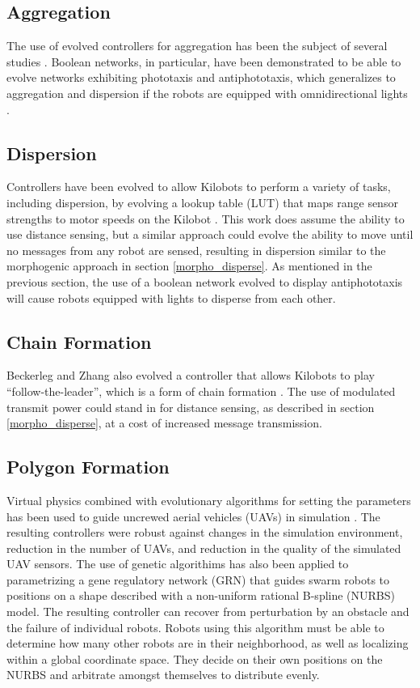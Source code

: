 \documentclass[]{article}
\begin{document}
\subsection{Aggregation}

The use of evolved controllers for aggregation has been the subject of several studies \cite{dorigo2004evolving,bahgecci2005evolving}. 
Boolean networks, in particular, have been demonstrated to be able to evolve networks exhibiting phototaxis and antiphototaxis, which generalizes to aggregation and dispersion if the robots are equipped with omnidirectional lights \cite{roli2011design}.

\subsection{Dispersion}

Controllers have been evolved to allow Kilobots to perform a variety of tasks, including dispersion, by evolving a lookup table (LUT) that maps range sensor strengths to motor speeds on the Kilobot \cite{beckerleg2016evolving}.
This work does assume the ability to use distance sensing, but a similar approach could evolve the ability to move until no messages from any robot are sensed, resulting in dispersion similar to the morphogenic approach in section \ref{morpho_disperse}. 
As mentioned in the previous section, the use of a boolean network evolved to display antiphototaxis will cause robots equipped with lights to disperse from each other. 

\subsection{Chain Formation}

Beckerleg and Zhang also evolved a controller that allows Kilobots to play ``follow-the-leader'', which is a form of chain formation \cite{beckerleg2016evolving}. 
The use of modulated transmit power could stand in for distance sensing, as described in section \ref{morpho_disperse}, at a cost of increased message transmission. 

\subsection{Polygon Formation}

Virtual physics combined with evolutionary algorithms for setting the parameters has been used to guide uncrewed aerial vehicles (UAVs) in simulation \cite{spears2004overview}. 
The resulting controllers were robust against changes in the simulation environment, reduction in the number of UAVs, and reduction in the quality of the simulated UAV sensors. 
The use of genetic algorithims has also been applied to parametrizing a gene regulatory network (GRN) that guides swarm robots to positions on a shape described with a non-uniform rational B-spline (NURBS) model. 
The resulting controller can recover from perturbation by an obstacle and the failure of individual robots. 
Robots using this algorithm must be able to determine how many other robots are in their neighborhood, as well as localizing within a global coordinate space. 
They decide on their own positions on the NURBS and arbitrate amongst themselves to distribute evenly. 
\end{document}
